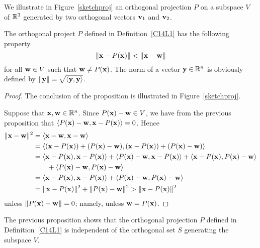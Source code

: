 We illustrate in Figure~\ref{sketchproj} an orthogonal projection $P$ on a
subspace $V$ of $\mathbb{R}^3$ generated by two orthogonal vectors
$\mathbf{v}_1$ and $\mathbf{v}_2$.


\begin{prop}
The orthogonal project $P$ defined in Definition~\ref{C14L1} has
the following property.
\[
  \|\mathbf{x} - P(\mathbf{x})\| < \|\mathbf{x} - \mathbf{w}\|
\]
for all $\mathbf{w} \in V$ such that $\mathbf{w} \neq P(\mathbf{x})$.  The norm
of a vector $\mathbf{y}\in \mathbb{R}^n$ is obviously defined by
$\|\mathbf{y}\| = \sqrt{\left\langle{\mathbf{y}} , {\mathbf{y}}\right\rangle}$.
\end{prop}

\begin{proof}
The conclusion of the proposition is illustrated in
Figure~\ref{sketchproj}.

Suppose that $\mathbf{x}, \mathbf{w} \in \mathbb{R}^n$.
Since $P(\mathbf{x})- \mathbf{w} \in V$, we have from the previous
proposition that $\left\langle{P(\mathbf{x})- \mathbf{w}} , {\mathbf{x} - P(\mathbf{x})}\right\rangle = 0$.
Hence
\begin{align*}
\|\mathbf{x} - \mathbf{w}\|^2 &= \left\langle{\mathbf{x} - \mathbf{w}} , {\mathbf{x} - \mathbf{w}}\right\rangle \\
& = \left\langle{(\mathbf{x} - P(\mathbf{x})) + (P(\mathbf{x})- \mathbf{w})} , {(\mathbf{x} - P(\mathbf{x})) + (P(\mathbf{x})- \mathbf{w})}\right\rangle \\
& = \left\langle{\mathbf{x} - P(\mathbf{x})} , {\mathbf{x} - P(\mathbf{x})}\right\rangle
+ \left\langle{P(\mathbf{x})- \mathbf{w}} , {\mathbf{x} - P(\mathbf{x})}\right\rangle
+ \left\langle{\mathbf{x} - P(\mathbf{x})} , {P(\mathbf{x})- \mathbf{w}}\right\rangle \\
&\qquad + \left\langle{P(\mathbf{x})- \mathbf{w}} , {P(\mathbf{x})- \mathbf{w}}\right\rangle \\
& = \left\langle{\mathbf{x} - P(\mathbf{x})} , {\mathbf{x} - P(\mathbf{x})}\right\rangle
+ \left\langle{P(\mathbf{x})- \mathbf{w}} , {P(\mathbf{x})- \mathbf{w}}\right\rangle \\
& = \|\mathbf{x} - P(\mathbf{x})\|^2 + \|P(\mathbf{x})- \mathbf{w}\|^2
> \|\mathbf{x} - P(\mathbf{x})\|^2
\end{align*}
unless $\|P(\mathbf{x}) - \mathbf{w}\| = 0$; namely, unless
$\mathbf{w} = P(\mathbf{x})$.
\end{proof}

\begin{rmk}
The previous proposition shows that the orthogonal projection $P$
defined in Definition~\ref{C14L1} is independent of the
orthogonal set $S$ generating the subspace $V$.
\end{rmk}


